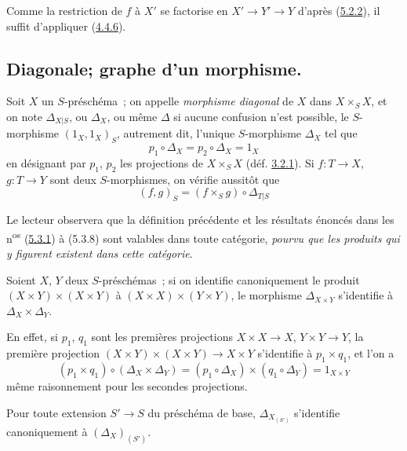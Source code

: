 Comme la restriction de $f$ à $X'$ se factorise en
$X'\to Y'\to Y$ d'après (\hyperref[I.5.2.2-fr]{5.2.2}), il suffit d'appliquer
(\hyperref[I.4.4.6-fr]{4.4.6}).

\subsection{Diagonale; graphe d'un morphisme.}
\label{subsection:I.5.3-fr}

\begin{env}[5.3.1]
\label{I.5.3.1-fr}
Soit $X$ un $S$-préschéma~; on appelle \emph{morphisme diagonal} de $X$ dans
$X\times_S X$, et on note $\Delta_{X|S}$, ou $\Delta_X$, ou même $\Delta$ si
aucune confusion n'est possible, le $S$-morphisme $(1_X,1_X)_S$, autrement
dit, l'unique $S$-morphisme $\Delta_X$ tel que
\[
  p_1\circ\Delta_X=p_2\circ\Delta_X=1_X
  \tag{5.3.1.1}\label{I.5.3.1.1-fr}
\]
en désignant par $p_1$, $p_2$ les projections de $X\times_S X$
(déf. \hyperref[I.3.2.1-fr]{3.2.1}). Si $f:T\to X$, $g:T\to Y$ sont deux
$S$-morphismes, on vérifie aussitôt que
\[
  (f,g)_S=(f\times_S g)\circ\Delta_{T|S}
  \tag{5.3.1.2}\label{I.5.3.1.2-fr}
\]

Le lecteur observera que la définition précédente et les résultats énoncés
dans les n\textsuperscript{os} (\hyperref[I.5.3.1-fr]{5.3.1}) à (5.3.8) sont
valables dans toute catégorie, \emph{pourvu que les produits qui y figurent
existent dans cette catégorie}.
\end{env}

\begin{proposition}[5.3.2]
\label{I.5.3.2-fr}
Soient $X$, $Y$ deux $S$-préschémas~; si on identifie canoniquement le produit
$(X\times Y)\times(X\times Y)$ à $(X\times X)\times(Y\times Y)$, le morphisme
$\Delta_{X\times Y}$ s'identifie à $\Delta_X\times\Delta_Y$.
\end{proposition}

En effet, si $p_1$, $q_1$ sont les premières projections
$X\times X\to X$, $Y\times Y\to Y$, la première projection
$(X\times Y)\times(X\times Y)\to X\times Y$ s'identifie à $p_1\times q_1$,
et l'on a
\[
  (p_1\times q_1)\circ(\Delta_X\times\Delta_Y)
  =(p_1\circ\Delta_X)\times(q_1\circ\Delta_Y)=1_{X\times Y}
\]
même raisonnement pour les secondes projections.

\begin{corollary}[5.3.4]
\label{I.5.3.4-fr}
Pour toute extension $S'\to S$ du préschéma de base,
$\Delta_{X_{(S')}}$ s'identifie canoniquement à $(\Delta_X)_{(S')}$.
\end{corollary}

